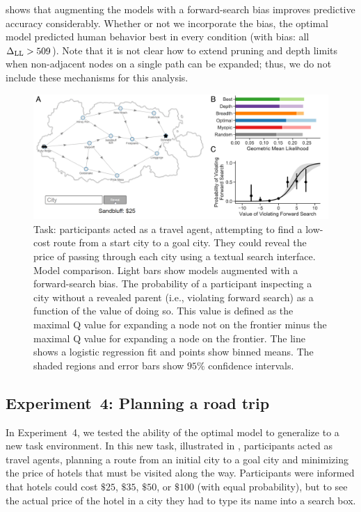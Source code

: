  shows that augmenting the models with a forward-search bias improves predictive accuracy considerably. Whether or not we incorporate the bias, the optimal model predicted human behavior best in every condition (with bias: all $\Delta_{\mathrm{LL}} > 509$). Note that it is not clear how to extend pruning and depth limits when non-adjacent nodes on a single path can be expanded; thus, we do not include these mechanisms for this analysis.


\begin{figure}[t!]
  \centering
  \includegraphics[width=\textwidth]{figs/planning/fig6.pdf}
  \caption{ 
     Task: participants acted as a travel agent, attempting to find a low-cost route from a start city to a goal city. They could reveal the price of passing through each city using a textual search interface.
     Model comparison. Light bars show models augmented with a forward-search bias.
     The probability of a participant inspecting a city without a revealed parent (i.e., violating forward search) as a function of the value of doing so. This value is defined as the maximal Q value for expanding a node not on the frontier minus the maximal Q value for expanding a node on the frontier. The line shows a logistic regression fit and points show binned means. The shaded regions and error bars show $95\%$ confidence intervals.
  }
  \label{fig:planning-exp4}
\end{figure}


\subsection{Experiment~4: Planning a road trip}\label{sec:planning-results4}

In Experiment~4, we tested the ability of the optimal model to generalize to a new task environment. In this new task, illustrated in , participants acted as travel agents, planning a route from an initial city to a goal city and minimizing the price of hotels that must be visited along the way. Participants were informed that hotels could cost $\$25$, $\$35$, $\$50$, or $\$100$ (with equal probability), but to see the actual price of the hotel in a city they had to type its name into a search box.

